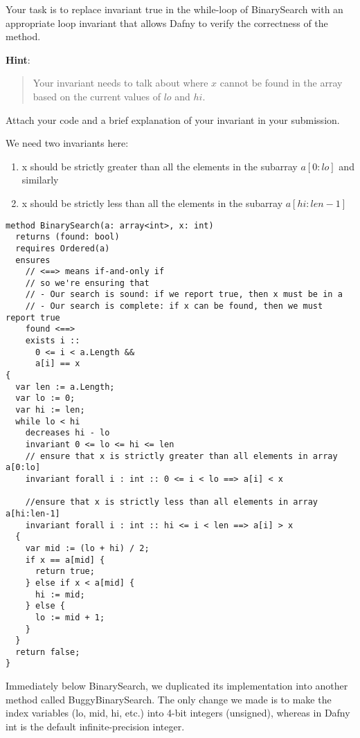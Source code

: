 \documentclass{jhwhw}
\begin{document}
Your task is to replace invariant true in the while-loop of BinarySearch with an appropriate loop invariant that allows Dafny to verify the correctness of the method.


\textbf{Hint}: 
\begin{quote} 
    Your invariant needs to talk about where $x$ cannot be found in the array based on the current values of $lo$ and $hi$. 
\end{quote}
Attach your code and a brief explanation of your invariant in your submission.

\solution

We need two invariants here:
\begin{enumerate}
    \renewcommand{\labelenumi}{\arabic{enumi}.}
    \item x should be strictly greater than all the elements in the subarray $a[0:lo]$ and similarly 
    \item x should be strictly less than all the elements in the subarray $a[hi:len-1]$
\end{enumerate}

\begin{lstlisting}
method BinarySearch(a: array<int>, x: int)
  returns (found: bool)
  requires Ordered(a)
  ensures
    // <==> means if-and-only if
    // so we're ensuring that
    // - Our search is sound: if we report true, then x must be in a
    // - Our search is complete: if x can be found, then we must report true
    found <==>
    exists i ::
      0 <= i < a.Length &&
      a[i] == x
{
  var len := a.Length;
  var lo := 0;
  var hi := len;
  while lo < hi
    decreases hi - lo
    invariant 0 <= lo <= hi <= len
    // ensure that x is strictly greater than all elements in array a[0:lo]
    invariant forall i : int :: 0 <= i < lo ==> a[i] < x

    //ensure that x is strictly less than all elements in array a[hi:len-1]
    invariant forall i : int :: hi <= i < len ==> a[i] > x
  {
    var mid := (lo + hi) / 2;
    if x == a[mid] {
      return true;
    } else if x < a[mid] {
      hi := mid;
    } else {
      lo := mid + 1;
    }
  }
  return false;
}
\end{lstlisting}
Immediately below BinarySearch, we duplicated its implementation into another method called BuggyBinarySearch. The only change we made is to make the index variables (lo, mid, hi, etc.) into 4-bit integers (unsigned), whereas in Dafny int is the default infinite-precision integer.
\end{document}
